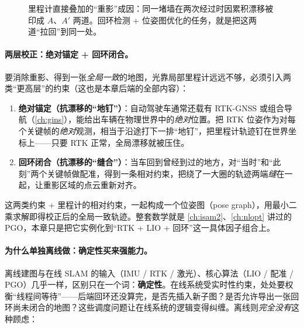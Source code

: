 \begin{figure}[H]
\centering
{}
\caption{里程计直接叠加的“重影”成因：同一堵墙在两次经过时因累积漂移被印成 $A$、$A'$ 两道。回环检测 + 位姿图优化的任务，就是把这两道“拉回”到同一处。}
\label{fig:lidar-map-ghost}
\end{figure}

\paragraph{两层校正：绝对锚定 + 回环闭合。}
要消除重影、得到一张\emph{全局一致}的地图，光靠局部里程计远远不够，必须引入两类“更高层”的约束（这也是本章后端的全部内容）：
\begin{enumerate}
  \item \textbf{绝对锚定（抗漂移的“地钉”）}：自动驾驶车通常还载有 RTK-GNSS 或组合导航（\cref{ch:gins}），能给出车辆在物理世界中的\emph{绝对}位置。把 RTK 位姿作为对每个关键帧的\emph{绝对}观测，相当于沿途打下一排“地钉”，把里程计轨迹钉在世界坐标上——只要 RTK 正常，全局漂移就被压住。
  \item \textbf{回环闭合（抗漂移的“缝合”）}：当车回到曾经到过的地方，对“当时”和“此刻”两个关键帧做配准，得到一条相对约束，把绕了一大圈的轨迹两端\emph{缝}在一起，让重影区域的点云重新对齐。
\end{enumerate}
这两类约束 + 里程计的相对约束，一起构成一个位姿图（pose graph），用最小二乘求解即得校正后的全局一致轨迹。整套数学就是 \cref{ch:isam2}、\cref{ch:nlopt} 讲过的 PGO，本章只是把它实例化到“RTK + LIO + 回环”这一具体因子组合上。

\paragraph{为什么单独离线做：确定性买来强能力。}
离线建图与在线 SLAM 的输入（IMU / RTK / 激光）、核心算法（LIO / 配准 / PGO）几乎一样，区别只在一个词：\textbf{确定性}。在线系统受实时性约束，处处要权衡“线程间等待”——后端回环还没算完，是否先插入新子图？是否允许导出一张回环尚未闭合的地图？这些调度问题让在线系统的逻辑变得纠缠。离线则\emph{完全没有}这种顾虑\cite{gao2023slamad}：

